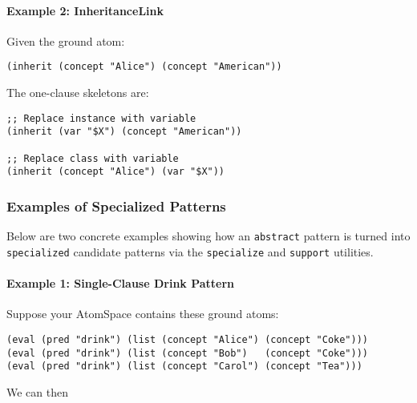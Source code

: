 \documentclass{article}
\begin{document}
\paragraph{Example 2: InheritanceLink}

Given the ground atom:

\begin{verbatim}
(inherit (concept "Alice") (concept "American"))
\end{verbatim}

The one-clause skeletons are:

\begin{verbatim}
;; Replace instance with variable
(inherit (var "$X") (concept "American"))

;; Replace class with variable
(inherit (concept "Alice") (var "$X"))
\end{verbatim}


\subsubsection{Examples of Specialized Patterns}

Below are two concrete examples showing how an \texttt{abstract} pattern is turned into \texttt{specialized} candidate patterns via the \texttt{specialize} and \texttt{support} utilities.

\paragraph{Example 1: Single-Clause Drink Pattern}

Suppose your AtomSpace contains these ground atoms:
\begin{verbatim}
(eval (pred "drink") (list (concept "Alice") (concept "Coke")))
(eval (pred "drink") (list (concept "Bob")   (concept "Coke")))
(eval (pred "drink") (list (concept "Carol") (concept "Tea")))
\end{verbatim}

We can then
\end{document}
